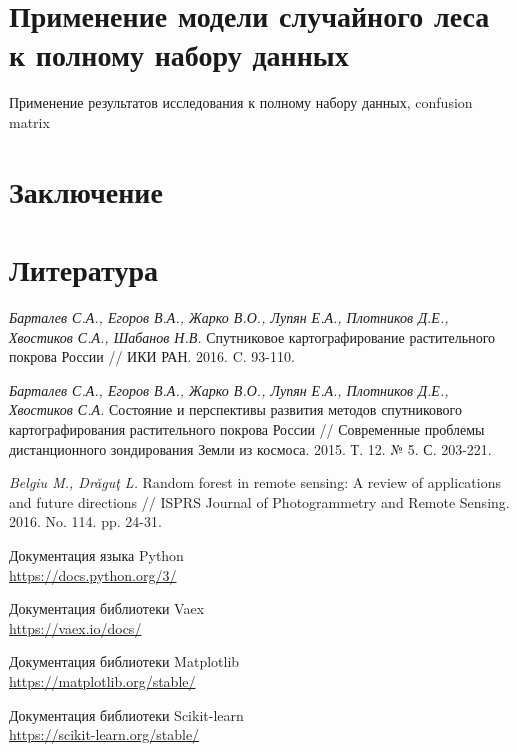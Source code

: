 \documentclass[14pt, a4paper, oneside]{extarticle}
\begin{document}
\section{Применение модели случайного леса к полному набору данных}
Применение результатов исследования к полному набору данных, confusion matrix
\newpage



\section{Заключение}
\newpage

\section{Литература}
\begingroup
\renewcommand{\section}[2]{}
\begin{thebibliography}{20}
    \textit{Барталев С.А., Егоров В.А., Жарко В.О., Лупян Е.А., Плотников Д.Е., Хвостиков С.А., Шабанов Н.В.} Спутниковое картографирование растительного покрова России // ИКИ РАН. 2016. C. 93-110.

    \textit{Барталев С.А., Егоров В.А., Жарко В.О., Лупян Е.А., Плотников Д.Е., Хвостиков С.А.} Состояние и перспективы развития методов спутникового картографирования растительного покрова России // Современные проблемы дистанционного зондирования Земли из космоса. 2015. Т. 12. № 5. С. 203-221.

    \textit{Belgiu M., Drăguţ L.} Random forest in remote sensing: A review of applications and future
    directions // ISPRS Journal of Photogrammetry and Remote Sensing. 2016. No. 114. pp. 24-31.
    
    Документация языка Python\\
    \url{https://docs.python.org/3/}

    Документация библиотеки Vaex\\
    \url{https://vaex.io/docs/}

    Документация библиотеки Matplotlib\\
    \url{https://matplotlib.org/stable/}

    Документация библиотеки Scikit-learn\\
    \url{https://scikit-learn.org/stable/}
\end{thebibliography}
\endgroup
\newpage
\end{document}
